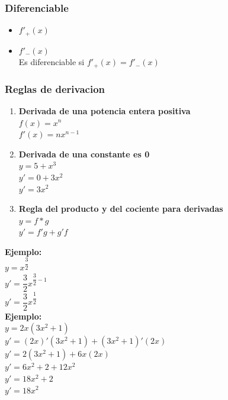\documentclass[stu, 12pt, letterpaper, donotrepeattitle, floatsintext, natbib]{apa7}
\begin{document}
    \subsubsection{Diferenciable}
    \begin{itemize}
        \item $f'_+(x)$\\[0.5cm]
        \item $f'_-(x)$\\[0.5cm]
        Es diferenciable si $f'_+(x)=f'_-(x)$\\[0.5cm]
    \end{itemize}

    \newpage

    \subsubsection{Reglas de derivacion}
    \begin{paracol}{2}
        \begin{enumerate}
            \item \textbf{Derivada de una potencia entera positiva}\\[0.5cm]
            $f(x)=x^n$\\[0.5cm]
            $f'(x)=nx^{n-1}$\\[0.5cm]
            \vspace{2cm}
            \item \textbf{Derivada de una constante es 0}\\[0.5cm]
            $y=5+x^3$\\[0.5cm]
            $y'=0+3x^2$\\[0.5cm]
            $y'=3x^2$\\[0.5cm]
            \item \textbf{Regla del producto y del cociente para derivadas}\\[0.5cm]
            $y=f*g$\\[0.5cm]
            $y'=f'g+g'f$\\[0.5cm]
        \end{enumerate}
        \switchcolumn
        \textbf{Ejemplo:}\\[0.5cm]
        $y=x^\dfrac{3}{2}$\\[0.5cm]
        $y'=\dfrac{3}{2}x^{\dfrac{3}{2}-1}$\\[0.5cm]
        $y'=\dfrac{3}{2}x^{\dfrac{1}{2}}$\\[0.5cm]

        \vspace{6.5cm}
        \textbf{Ejemplo:}\\[0.5cm]
        $y=2x(3x^2+1)$\\[0.5cm]
        $y'=(2x)'(3x^2+1)+(3x^2+1)'(2x)$\\[0.5cm]
        $y'=2(3x^2+1)+6x(2x)$\\[0.5cm]
        $y'=6x^2+2+12x^2$\\[0.5cm]
        $y'=18x^2+2$\\[0.5cm]
        $y'=18x^2$\\[0.5cm]
    \end{paracol}
    \newpage
\end{document}

